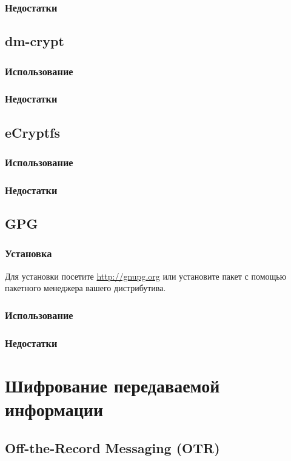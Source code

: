 \subsubsection{Недостатки}
\subsection{dm-crypt}
\subsubsection{Использование}
\subsubsection{Недостатки}
\subsection{eCryptfs}
\subsubsection{Использование}
\subsubsection{Недостатки}
\subsection{GPG}
\subsubsection{Установка}
Для установки посетите \url{http://gnupg.org} или установите пакет с помощью пакетного менеджера вашего дистрибутива.
\subsubsection{Использование}
\subsubsection{Недостатки}

\section{Шифрование передаваемой информации}
\subsection{Off-the-Record Messaging (OTR)}

